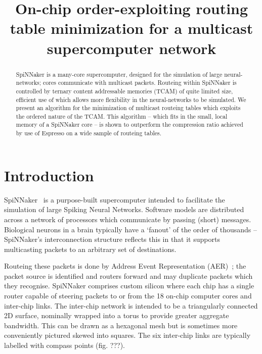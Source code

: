 \documentclass[conference]{IEEEtran}
\title{On-chip order-exploiting routing table minimization for a multicast supercomputer network}
\author{%
  \IEEEauthorblockN{Andrew~Mundy and Jim~D.~Garside}
  \IEEEauthorblockA{\{\texttt{andrew.mundy}, \texttt{jim.garside}\}\texttt{@manchester.ac.uk}\\
                    School of Computer Science,\\
		    University of Manchester,\\
                    M13 9PL, UK}
}
\begin{document}
  \maketitle

  \begin{abstract}
SpiNNaker is a many-core supercomputer, designed for the simulation of large neural-networks; cores communicate with multicast packets.
Routeing within SpiNNaker is controlled by ternary content addressable memories (TCAM) of quite limited size, efficient use of which allows more flexibility in the neural-networks to be simulated.
We present an algorithm for the minimization of multicast routeing tables which exploits the ordered nature of the TCAM.
This algorithm -- which fits in the small, local memory of a SpiNNaker core -- is shown to outperform the compression ratio achieved by use of Espresso on a wide sample of routeing tables.

  \end{abstract}

  \section{Introduction}

SpiNNaker~\parencite{Furber2014} is a purpose-built supercomputer intended to facilitate the simulation of large Spiking Neural Networks.
Software models are distributed across a network of processors which communicate by passing (short) messages.
Biological neurons in a brain typically have a `fanout' of the order of thousands -- SpiNNaker's interconnection structure reflects this in that it supports multicasting packets to an arbitrary set of destinations.

Routeing these packets is done by Address Event Representation (AER)~\parencite{Boahen2000}; the packet source is identified and routers forward and may duplicate packets which they recognise.
SpiNNaker comprises custom silicon where each chip has a single router capable of steering packets to or from the 18 on-chip computer cores and inter-chip links.
The inter-chip network is intended to be a triangularly connected 2D surface, nominally wrapped into a torus to provide greater aggregate bandwidth.
This can be drawn as a hexagonal mesh but is sometimes more conveniently pictured skewed into squares.
The six inter-chip links are typically labelled with compass points (fig. ???).
\end{document}
